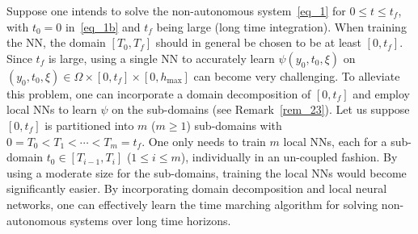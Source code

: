 \begin{remark}\label{rem_027}
  Suppose one intends to solve the non-autonomous
  system~\eqref{eq_1} for $0\leqslant t\leqslant t_f$,
  with $t_0=0$ in~\eqref{eq_1b} and $t_f$ being large (long time integration).
  When training the NN, the domain $[T_0,T_f]$
  should in general be chosen to be at least $[0,t_f]$.
  Since $t_f$ is large, using a single NN  to accurately
  learn $\psi(y_0,t_0,\xi)$ 
  on $(y_0,t_0,\xi)\in\Omega\times[0,t_f]\times[0,h_{\max}]$
  can become very challenging.
  To alleviate this problem, one can incorporate a domain decomposition
  of $[0,t_f]$ and employ local NNs
  to learn $\psi$ on the sub-domains (see Remark~\ref{rem_23}).
  Let us suppose $[0,t_f]$ is partitioned into $m$ ($m\geqslant 1$) sub-domains with
  $0=T_0<T_1<\cdots<T_m=t_f$.
  One only
  needs to train $m$ local NNs, each for a sub-domain
  $t_0\in[T_{i-1},T_i]$ ($1\leqslant i\leqslant m$),
  individually in an un-coupled fashion.
  By using a moderate size for the sub-domains,
  training the local NNs would become significantly
  easier. By incorporating domain decomposition and local neural
  networks, one can effectively learn the time marching algorithm
  for solving non-autonomous systems over long time horizons.

\end{remark}


